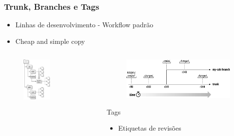 \documentclass{beamer}
\begin{document}
\begin{frame}
    \frametitle{Trunk, Branches e Tags}

    \begin{itemize}
        \item Linhas de desenvolvimento - Workflow padr\~ao
        \item Cheap and simple copy
    \end{itemize}
    \begin{columns}
        \begin{column}{.5\textwidth}
            \begin{figure}
                \includegraphics[width= 0.5\textwidth]{figures/copy}
            \end{figure}
        \end{column}
        \begin{column}{.5\textwidth}
            \begin{figure}
                \includegraphics[width = 1.1\textwidth]{figures/branche}
            \end{figure}
            \begin{block}{Tags}
                \begin{itemize}
                    \item Etiquetas de revis\~oes
                \end{itemize}
            \end{block}
        \end{column}

    \end{columns}

\end{frame}
\end{document}
